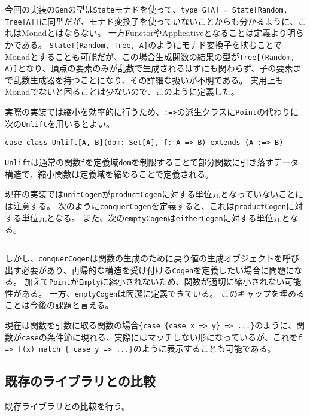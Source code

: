 \documentclass[a4paper,xelatex,ja=standard,jafont=noto]{bxjsarticle}
\theoremstyle{definition}
\begin{document}
今回の実装の\texttt{Gen}の型は\texttt{State}モナドを使って、\texttt{type G[A] = State[Random, Tree[A]]}に同型だが、モナド変換子を使っていないことからも分かるように、これはMonadとはならない。
一方FunctorやApplicativeとなることは定義より明らかである。
\texttt{StateT[Random, Tree, A]}のようにモナド変換子を挟むことでMonadとすることも可能だが、この場合生成関数の結果の型が\texttt{Tree[(Random, A)]}となり、頂点の要素のみが乱数で生成されるはずにも関わらず、子の要素まで乱数生成器を持つことになり、その詳細な扱いが不明である。
実用上もMonadでないと困ることは少ないので、このように定義した。

実際の実装では縮小を効率的に行うため、\texttt{:=>}の派生クラスに\texttt{Point}の代わりに次の\texttt{Unlift}を用いるとよい。

\begin{verbatim}
case class Unlift[A, B](dom: Set[A], f: A => B) extends (A :=> B)
\end{verbatim}

\texttt{Unlift}は通常の関数\texttt{f}を定義域\texttt{dom}を制限することで部分関数に引き落すデータ構造で、縮小関数は定義域を縮めることで定義される。

現在の実装では\texttt{unitCogen}が\texttt{productCogen}に対する単位元となっていないことには注意する。
次のように\texttt{conquerCogen}を定義すると、これは\texttt{productCogen}に対する単位元となる。
また、次の\texttt{emptyCogen}は\texttt{eitherCogen}に対する単位元となる。

\inputminted[breaklines,firstline=184,lastline=187]{scala}{../src/main/scala/minicheck.scala}

しかし、\texttt{conquerCogen}は関数の生成のために戻り値の生成オブジェクトを呼び出す必要があり、再帰的な構造を受け付ける\texttt{Cogen}を定義したい場合に問題になる。
加えて\texttt{Point}が\texttt{Empty}に縮小されないため、関数が適切に縮小されない可能性がある。
一方、\texttt{emptyCogen}は簡潔に定義できている。
このギャップを埋めることは今後の課題と言える。

現在は関数を引数に取る関数の場合\texttt{\{case \{case x => y\} => ...\}}のように、関数が\texttt{case}の条件節に現れる、実際にはマッチしない形になっているが、これを\texttt{f => f(x) match \{ case y => ...\}}のように表示することも可能である。

\subsection{既存のライブラリとの比較}

既存ライブラリとの比較を行う。
\end{document}
